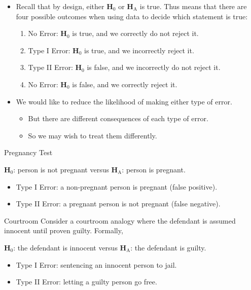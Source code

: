 \begin{itemize}
    \item Recall that by design, either $ \mathbf{H}_0 $ or $ \mathbf{H}_\text{A} $ is true.
          Thus means that there are four possible outcomes when using data to decide which
          statement is true:
          \begin{enumerate}[(1)]
              \item No Error: $ \mathbf{H}_0 $ is true, and we correctly do not reject it.
              \item Type I Error: $ \mathbf{H}_0 $ is true, and we incorrectly reject it.
              \item Type II Error: $ \mathbf{H}_0 $ is false, and we incorrectly do not reject it.
              \item No Error: $ \mathbf{H}_0 $ is false, and we correctly reject it.
          \end{enumerate}
    \item We would like to reduce the likelihood of making either type of error.
          \begin{itemize}
              \item But there are different consequences of each type of error.
              \item So we may wish to treat them differently.
          \end{itemize}
\end{itemize}
\begin{Example}{Pregnancy Test}{}
    \begin{tightcenter}
        $ \mathbf{H}_0 $: person is not pregnant versus $ \mathbf{H}_\text{A} $: person is pregnant.
    \end{tightcenter}
    \begin{itemize}
        \item Type I Error: a non-pregnant person is pregnant (false positive).
        \item Type II Error: a pregnant person is not pregnant (false negative).
    \end{itemize}
\end{Example}
\begin{Example}{Courtroom}{}
    Consider a courtroom analogy where the defendant is assumed innocent until proven guilty. Formally,
    \begin{tightcenter}
        $ \mathbf{H}_0 $: the defendant is innocent versus $ \mathbf{H}_\text{A} $: the defendant is guilty.
    \end{tightcenter}
    \begin{itemize}
        \item Type I Error: sentencing an innocent person to jail.
        \item Type II Error: letting a guilty person go free.
    \end{itemize}
\end{Example}
